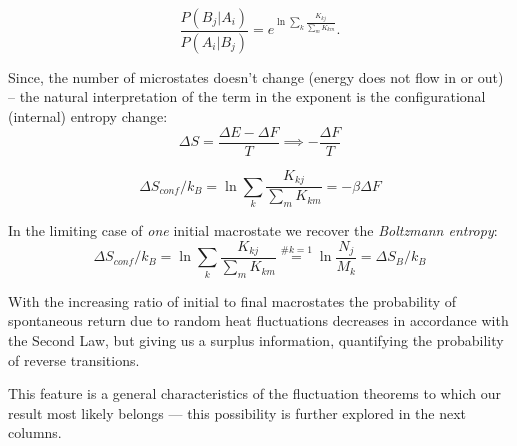 \documentclass[a0]{sciposter}
\begin{document}
\begin{multicols}{3}
\begin{flushleft}
\begin{tcolorbox}[colframe=red!500!white,colback=white!50!white,boxrule=3pt]
\begin{equation}
\label{MacrostatesPRatio}
  \frac{P(B_j|A_i)}{P(A_i|B_j)}= e^{\ln{\sum_{k} \frac{K_{kj}}{\sum_m K_{km}}}}.
\end{equation}
\end{tcolorbox}
\vspace{0.5cm}

Since, the number of microstates doesn't change (energy does not flow in or out) -- the natural interpretation of the term in the exponent is the configurational (internal) entropy change: 
\begin{equation}
\label{ConfEntropy}
  \Delta S = \frac{\Delta E - \Delta F}{T} \implies -\frac{\Delta F}{T}
\end{equation}
\vspace{-0.5cm}
\begin{tcolorbox}[colframe=green!500!white,colback=white!50!white,boxrule=3pt]
\begin{equation}
\Delta S_{conf} /k_B = \ln{\sum_{k} \frac{K_{kj}}{\sum_m K_{km}}} = - \beta \Delta F
\end{equation}
\end{tcolorbox}
\vspace{-0.5cm}
In the limiting case of \textit{one} initial macrostate we recover the \textit{Boltzmann entropy}:
\vspace{-0.5cm}
\begin{equation}
\Delta S_{conf} /k_B = \ln{\sum_{k} \frac{K_{kj}}{\sum_m K_{km}}} \stackrel{\#k=1}{=} \ln{\frac{N_j}{M_k}} =\Delta S_{B} /k_B
\end{equation}
\vspace{-0.5cm}

With the increasing ratio of initial to final macrostates the probability of spontaneous return due to random heat fluctuations decreases in accordance with the Second Law, but giving us a surplus information, quantifying the probability of reverse transitions. 
\vspace{0.3cm}

This feature is a general characteristics of the fluctuation theorems to which our result most likely belongs --- this possibility is further explored in the next columns.
\vspace{2.0cm}
\begin{displaymath}
\end{displaymath}
\begin{displaymath}
\end{displaymath}
\end{flushleft}
\columnbreak
\begin{flushleft}

\end{flushleft}
\end{multicols}
\end{document}
